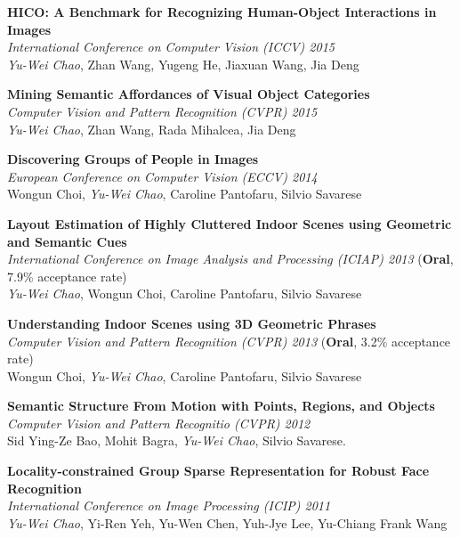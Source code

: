 \documentclass[10pt]{article}
\makeatletter
\newlength{\bibhang}
\newlength{\bibsep}
 {\@listi \global\bibsep\itemsep \global\advance\bibsep by\parsep}
\newenvironment{bibsection}%
        {\begin{list}{}{%
        \setlength{\leftmargin}{0em}
       \setlength{\itemsep}{\bibsep}%
       \setlength{\parsep}{\z@}%
        \setlength{\partopsep}{0pt}%
        \setlength{\topsep}{0pt}}}
        {\end{list}\vspace{-.6\baselineskip}}           %
\makeatother
\begin{document}
\begin{bibsection}
\item[] \textbf{HICO: A Benchmark for Recognizing Human-Object Interactions in Images}\\ \emph{International Conference on Computer Vision (ICCV) 2015}\\ \emph{Yu-Wei Chao}, Zhan Wang, Yugeng He, Jiaxuan Wang, Jia Deng
\item[] \textbf{Mining Semantic Affordances of Visual Object Categories}\\ \emph{Computer Vision and Pattern Recognition (CVPR) 2015}\\ \emph{Yu-Wei Chao}, Zhan Wang, Rada Mihalcea, Jia Deng
\item[] \textbf{Discovering Groups of People in Images}\\ \emph{European Conference on Computer Vision (ECCV) 2014}\\ Wongun Choi, \emph{Yu-Wei Chao}, Caroline Pantofaru, Silvio Savarese
\item[] \textbf{Layout Estimation of Highly Cluttered Indoor Scenes using Geometric and Semantic Cues}\\ \emph{International Conference on Image Analysis and Processing (ICIAP) 2013} (\textbf{Oral}, 7.9\% acceptance rate)\\ \emph{Yu-Wei Chao}, Wongun Choi, Caroline Pantofaru, Silvio Savarese
\item[] \textbf{Understanding Indoor Scenes using 3D Geometric Phrases}\\ \emph{Computer Vision and Pattern Recognition (CVPR) 2013} (\textbf{Oral}, 3.2\% acceptance rate)\\ Wongun Choi, \emph{Yu-Wei Chao}, Caroline Pantofaru, Silvio Savarese
\item[] \textbf{Semantic Structure From Motion with Points, Regions, and Objects}\\ \emph{Computer Vision and Pattern Recognitio (CVPR) 2012}\\ Sid Ying-Ze Bao, Mohit Bagra, \emph{Yu-Wei Chao}, Silvio Savarese.
\item[] \textbf{Locality-constrained Group Sparse Representation for Robust Face Recognition}\\ \emph{International Conference on Image Processing (ICIP) 2011}\\ \emph{Yu-Wei Chao}, Yi-Ren Yeh, Yu-Wen Chen, Yuh-Jye Lee, Yu-Chiang Frank Wang
\end{bibsection}
\vspace{.15in} %
\end{document}
